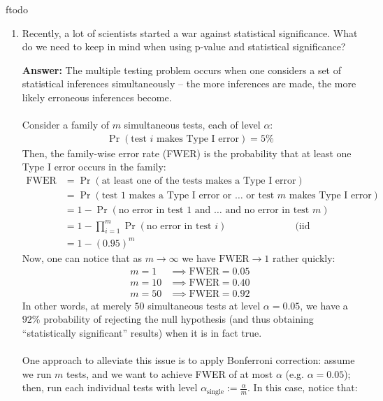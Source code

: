 ƒtodo\documentclass{article}
\newenvironment{QandA}{\begin{enumerate}[label=\arabic*.]}{\end{enumerate}}
\newenvironment{InnerQandA}{\begin{enumerate}[label=\roman*.]}{\end{enumerate}}
\newenvironment{answer}{\par\normalfont \textbf{Answer:}}{}
\begin{document}
\begin{QandA}
\begin{InnerQandA}
        \item Recently, a lot of scientists started a war against statistical significance. What do we need to keep in mind when using p-value and statistical significance?
        \begin{answer}
            The multiple testing problem occurs when one considers a set of statistical inferences simultaneously -- the more inferences are made, the more likely erroneous inferences become. \\\\
            Consider a family of $m$ simultaneous tests, each of level $\alpha$:
            \begin{align*}
                \Pr (\text{test } i \text{ makes Type I error}) = 5\%
            \end{align*}
            Then, the family-wise error rate (FWER) is the probability that at least one Type I error occurs in the family:
            \begin{align*}
                \text{FWER} &= \Pr (\text{at least one of the tests makes a Type I error}) \\
                &= \Pr(\text{test } 1 \text{ makes a Type I error or }\ldots \text{ or test } m \text{ makes Type I error}) \\
                &= 1 - \Pr(\text{no error in test } 1 \text{ and } \ldots \text{ and no error in test } m) \\
                &= 1 - \prod_{i=1}^m \Pr(\text{no error in test } i) & \text{(iid assumption)}\\
                &= 1 - (0.95)^m 
            \end{align*}
            Now, one can notice that as $m \rightarrow \infty$ we have $\text{FWER} \rightarrow 1$ rather quickly:
            \begin{align*}
                m = 1 &\implies \text{FWER} = 0.05 \\
                m = 10 &\implies \text{FWER} = 0.40 \\
                m = 50 &\implies \text{FWER} = 0.92
            \end{align*}
            In other words, at merely $50$ simultaneous tests at level $\alpha=0.05$, we have a $92\%$ probability of rejecting the null hypothesis (and thus obtaining ``statistically significant'' results) when it is in fact true.\\\\
            One approach to alleviate this issue is to apply Bonferroni correction: assume we run $m$ tests, and we want to achieve FWER of at most $\alpha$ (e.g. $\alpha=0.05$); then, run each individual tests with level $\alpha_{\text{single}}:= \frac{\alpha}{m}$. In this case, notice that:

\end{answer}
\end{InnerQandA}
\end{QandA}
\end{document}
